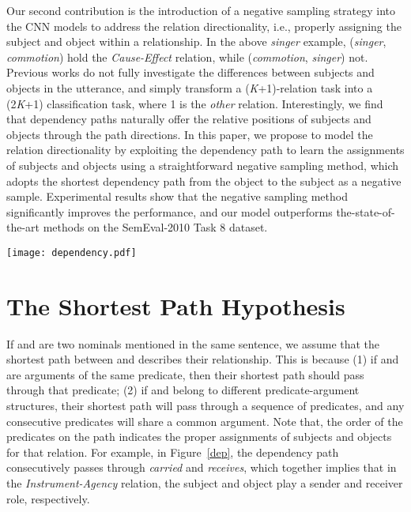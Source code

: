 \documentclass[11pt,a4paper]{article}
\begin{document}
Our second contribution is the introduction of a negative sampling strategy into the CNN models to address the relation directionality, i.e., properly assigning the subject and object within a relationship. In the above \textit{singer} example, (\textit{singer},  \textit{commotion}) hold the \textit{Cause-Effect} relation, while (\textit{commotion}, \textit{singer}) not. Previous works do not fully investigate the differences between subjects and objects in the utterance, and simply transform  a (\textit{K}+1)-relation task into a (2\textit{K}+1) classification task, where 1 is the \textit{other} relation. Interestingly, we find that dependency paths naturally offer the relative positions of subjects and objects through the path directions.  In this paper, we propose to model the relation directionality by exploiting the dependency path to learn the assignments of subjects and objects using a straightforward negative sampling method, which adopts the shortest dependency path from the object to the subject as a negative sample. Experimental results show that the negative sampling method significantly improves the performance, and our model outperforms the-state-of-the-art methods on the SemEval-2010 Task 8 dataset.










\begin{figure*}[htp!]
\centering\texttt{[image: dependency.pdf]} 
\caption{ \label{dep} The shortest dependency path representation for an example sentence from SemEval-08.}
\end{figure*}
\section{The Shortest Path Hypothesis}
If  and  are two nominals mentioned in the same sentence, we assume that the shortest path between  and  describes their relationship. This is because 
(1) if  and  are arguments of the same predicate, then their shortest path should
 pass through that predicate; 
(2) if  and  belong to different predicate-argument structures, their shortest path will pass through a sequence of predicates,  
and any consecutive predicates  will share a common argument. Note that, the order of the predicates on the path indicates the proper assignments of subjects and objects for that relation. For example, in Figure~\ref{dep}, the dependency path consecutively passes through  \textit{carried} and \textit{receives}, which together implies that in the \textit{Instrument-Agency} relation, the subject and object play a sender and receiver role, respectively. 
\end{document}

